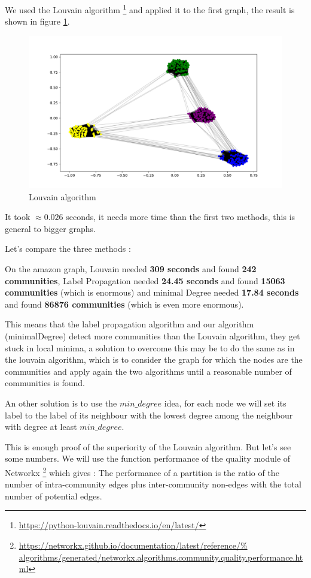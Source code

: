 \documentclass{article}
\begin{document}
We used the Louvain algorithm%
\footnote{\url{https://python-louvain.readthedocs.io/en/latest/}}
and applied it to the first graph, the result is shown in figure
\ref{fig:louv}.
\newpage
\begin{figure}[!ht]
    \centering
    \includegraphics[width=\linewidth]{plots/images1/Louvain.pdf}
    \caption{Louvain algorithm}
    \label{fig:louv}
\end{figure}

It took $\approx 0.026$ seconds, it needs more time than the first two
methods, this is general to bigger graphs.

Let's compare the three methods :

On the amazon graph, Louvain needed \textbf{309 seconds} and found \textbf{242
communities}, Label Propagation needed \textbf{24.45 seconds} and found
\textbf{15063 communities} (which is enormous) and minimal Degree needed
\textbf{17.84 seconds} and found \textbf{86876 communities} (which is even more
enormous).

This means that the label propagation algorithm and our algorithm
(minimalDegree) detect more communities than the Louvain algorithm, they get
stuck in local minima, a solution to overcome this may be to do the same as in
the louvain algorithm, which is to consider the graph for which the nodes are
the communities and apply again the two algorithms until a reasonable number
of communities is found.

An other solution is to use the $min\_degree$ idea, for each node we will set
its label to the label of its neighbour with the lowest degree among the
neighbour with degree at least $min\_degree$.

 This is enough proof of the superiority of the Louvain algorithm. But let's
 see some numbers.
 We will use the function performance of the quality module of Networkx%
 \footnote{\url{https://networkx.github.io/documentation/latest/reference/%
 algorithms/generated/networkx.algorithms.community.quality.performance.html}}
 which gives : The performance of a partition is the ratio of the number of
 intra-community edges plus inter-community non-edges with the total number of
 potential edges.
\end{document}
